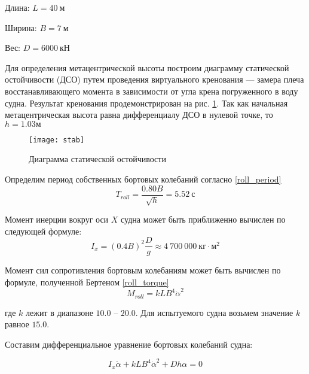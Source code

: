 \begin{description}
	\item	Длина: $L = 40\ \text{м}$
	\item	Ширина: $B = 7\ \text{м}$
	\item	Вес: $D = 6 000\ \text{кН}$
\end{description}

Для определения метацентрической высоты построим диаграмму статической остойчивости (ДСО) путем проведения виртуального кренования --- замера плеча восстанавливающего момента в зависимости от угла крена погруженного в воду судна. Результат кренования продемонстрирован на рис. \ref{drift:stab}. Так как начальная метацентрическая высота равна дифференциалу ДСО в нулевой точке, то $h=1.03 м$

\begin{figure}[ht]
\begin{center}
\texttt{[image: stab]}
\end{center}
\caption{Диаграмма статической остойчивости}
\label{drift:stab}
\end{figure}

Определим период собственных бортовых колебаний согласно \citep{hanovich47} \eqref{roll_period}
\begin{equation}
	T_{roll} = \frac{0.80B}{\sqrt{h}} = 5.52\ \text{с}
	\label{roll_period}
\end{equation}

Момент инерции вокруг оси $X$ судна может быть приближенно вычислен по следующей формуле:
\begin{equation}
	I_{x} = (0.4B)^2 \frac{D}{g} \approx 4\ 700\ 000\ \text{кг}\cdot \text{м}^2
	\label{roll_torque}
\end{equation}



Момент сил сопротивления бортовым колебаниям может быть вычислен по формуле, полученной Бертеном \eqref{roll_torque}
\begin{equation}
	M_{roll} = kLB^4\dot{\alpha}^2
	\label{roll_torque}
\end{equation}

где $k$ лежит в диапазоне $10.0$ -- $20.0$. Для испытуемого судна возьмем значение $k$ равное $15.0$.

Составим дифференциальное уравнение бортовых колебаний судна:

\begin{equation}
	I_x \ddot{\alpha} + kLB^4\dot{\alpha}^2 + Dh \alpha = 0
	\label{roll_eq}
\end{equation}

